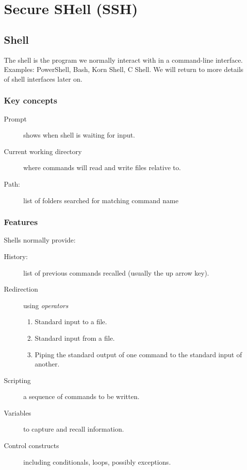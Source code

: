 \chapter{Secure SHell (SSH)}
\label{ch:ssh}

\section{Shell}

The shell is the program we normally interact with in a command-line interface.
Examples: PowerShell, Bash, Korn Shell, C Shell.
We will return to more details of shell interfaces later on. 

\subsection{Key concepts}

\begin{description}
\item[Prompt] shows when shell is waiting for input.
\item[Current working directory] where commands will read and write files relative to.
\item[Path:] list of folders searched for matching command name
\end{description}

\subsection{Features}

Shells normally provide:

\begin{description}
\item[History:] list of previous commands recalled (usually the up arrow key).
\item[Redirection] using \textit{operators}
  \begin{enumerate}
  \item Standard input to a file.  
  \item Standard input from a file.
  \item Piping the standard output of one command to the standard input of another.
  \end{enumerate}
\item[Scripting] a sequence of commands to be written.
\item[Variables] to capture and recall information.
\item[Control constructs] including conditionals, loops, possibly exceptions.
\end{description}

